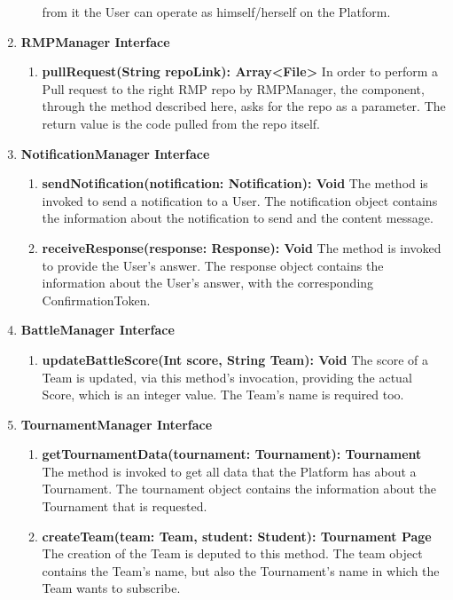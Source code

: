 \begin{enumerate}
\begin{enumerate}[label=$\bullet$]
            from it the User can operate as himself/herself on the Platform.
        \end{enumerate}
    \item \textbf{RMPManager Interface}
        \begin{enumerate}[label=$\bullet$]
            \item \textbf{pullRequest(String repoLink): Array<File>} In order to perform a Pull request to the right RMP repo by RMPManager, the component, through the method described here, asks for the repo as a parameter. The return 
            value is the code pulled from the repo itself.
        \end{enumerate} 
    \item \textbf{NotificationManager Interface}
        \begin{enumerate}[label=$\bullet$]
            \item \textbf{sendNotification(notification: Notification): Void} The method is invoked to send a notification to a User. The notification object contains the information about the notification to send and the content
            message.
            \item \textbf{receiveResponse(response: Response): Void} The method is invoked to provide the User's answer. The response object contains the information about the User's answer, with the corresponding ConfirmationToken.
        \end{enumerate}
    \item \textbf{BattleManager Interface}
        \begin{enumerate}[label=$\bullet$]
            \item \textbf{updateBattleScore(Int score, String Team): Void} The score of a Team is updated, via this method's invocation, providing the actual Score, which is an integer value. The Team's name is required too.
        \end{enumerate}
    \item \textbf{TournamentManager Interface}
        \begin{enumerate}[label=$\bullet$]
            \item \textbf{getTournamentData(tournament: Tournament): Tournament} The method is invoked to get all data that the Platform has about a Tournament. The tournament object contains the information about the Tournament that 
            is requested.
            \item \textbf{createTeam(team: Team, student: Student): Tournament Page} The creation of the Team is deputed to this method. The team object contains the Team's name, but also the Tournament's name in which the Team wants to subscribe. 

\end{enumerate}
\end{enumerate}
